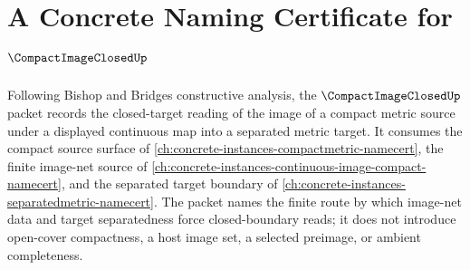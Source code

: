 \chapter{A Concrete Naming Certificate for $\CompactImageClosedUp$}
\label{ch:concrete-instances-compact-image-closed-namecert}

Following Bishop and Bridges constructive analysis, the $\CompactImageClosedUp$ packet records the closed-target reading of the image of a compact metric source under a displayed continuous map into a separated metric target. It consumes the compact source surface of \autoref{ch:concrete-instances-compactmetric-namecert}, the finite image-net source of \autoref{ch:concrete-instances-continuous-image-compact-namecert}, and the separated target boundary of \autoref{ch:concrete-instances-separatedmetric-namecert}. The packet names the finite route by which image-net data and target separatedness force closed-boundary reads; it does not introduce open-cover compactness, a host image set, a selected preimage, or ambient completeness.

